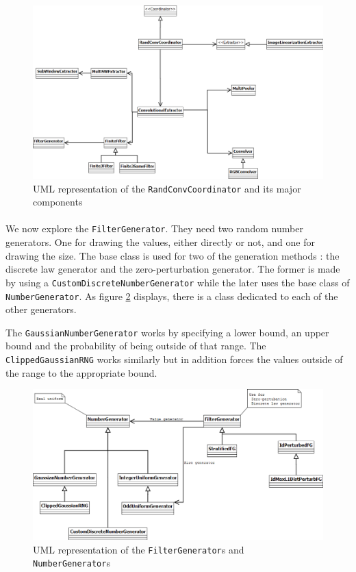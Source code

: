 \documentclass[a4paper]{report}
\begin{document}
		
		\begin{figure}
			\centering
				\includegraphics[width=1.00\textwidth]{images/uml-RandConvCoord.png}
			\caption{UML representation of the \texttt{RandConvCoordinator} and its major components}
			\label{fig:uml-ConvolutionalExtractor}
		\end{figure}
		

		
		
		\paragraph{}
		We now explore the \texttt{FilterGenerator}. They need two random number generators. One for drawing the values, either directly or not, and one for drawing the size. The base class is used for two of the generation methods : the discrete law generator and the zero-perturbation generator. The former is made by using a \texttt{CustomDiscreteNumberGenerator} while the later uses the base class of \texttt{NumberGenerator}. 
		As figure \ref{fig:uml-filtergen} displays, there is a class dedicated to each of the other generators.
		\par
		The \texttt{GaussianNumberGenerator} works by specifying a lower bound, an upper bound and the probability of being outside of that range. The \texttt{ClippedGaussianRNG} works similarly but in addition forces the values outside of the range to the appropriate bound.
		
		
		\begin{figure}
			\centering
				\includegraphics[width=1.00\textwidth]{images/uml-filtergen.png}
			\caption{UML representation of the \texttt{FilterGenerator}s and \texttt{NumberGenerator}s}
			\label{fig:uml-filtergen}
		\end{figure}
		
\end{document}
